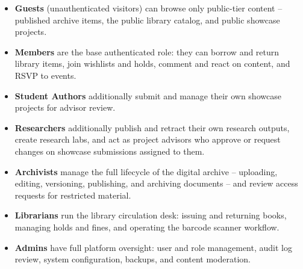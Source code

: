\documentclass[12pt]{article}
\begin{document}
\begin{itemize}[leftmargin=1.4em]
\item \textbf{Guests} (unauthenticated visitors) can browse only public-tier content -- published archive items, the public library catalog, and public showcase projects.
\item \textbf{Members} are the base authenticated role: they can borrow and return library items, join wishlists and holds, comment and react on content, and RSVP to events.
\item \textbf{Student Authors} additionally submit and manage their own showcase projects for advisor review.
\item \textbf{Researchers} additionally publish and retract their own research outputs, create research labs, and act as project advisors who approve or request changes on showcase submissions assigned to them.
\item \textbf{Archivists} manage the full lifecycle of the digital archive -- uploading, editing, versioning, publishing, and archiving documents -- and review access requests for restricted material.
\item \textbf{Librarians} run the library circulation desk: issuing and returning books, managing holds and fines, and operating the barcode scanner workflow.
\item \textbf{Admins} have full platform oversight: user and role management, audit log review, system configuration, backups, and content moderation.
\end{itemize}
\end{document}

